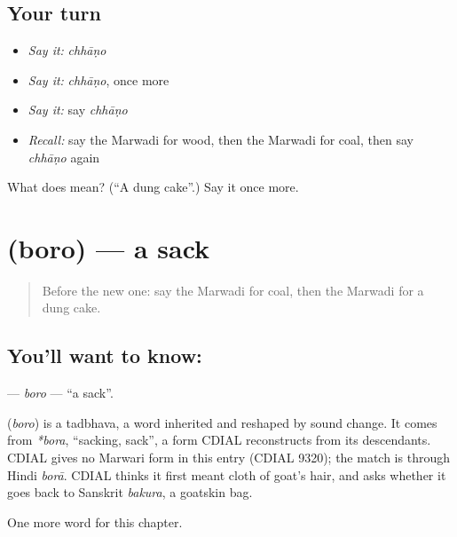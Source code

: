 \subsection*{Your turn}
\begin{itemize}
\raggedright
  \item \emph{Say it:} \emph{chhāṇo}
  \item \emph{Say it:} \emph{chhāṇo}, once more
  \item \emph{Say it:} say \emph{chhāṇo}
  \item \emph{Recall:} say the Marwadi for wood, then the Marwadi for coal, then say \emph{chhāṇo} again
\end{itemize}

\begin{tcolorbox}[breakable,colback=teal!4,colframe=teal!35!black,title={Before you move on}]
What does  mean? (\textquotedblleft{}A dung cake\textquotedblright{}.) Say it once more.
\end{tcolorbox}
\section[\texorpdfstring{\mw{बोरो} (boro)}{बोरो (boro)}]{ (boro) — a sack}

\label{lesson:MW-C126-boro}



\begin{quote}
Before the new one: say the Marwadi for coal, then the Marwadi for a dung cake.
\end{quote}

\subsection*{You'll want to know: }
\textbf{} — \emph{boro} — \textquotedblleft{}a sack\textquotedblright{}.

\begin{cousinweb}
\textbf{} (\emph{boro}) is a tadbhava, a word inherited and reshaped by sound change. It comes from \emph{*bora}, \textquotedblleft{}sacking, sack\textquotedblright{}, a form CDIAL reconstructs from its descendants. CDIAL gives no Marwari form in this entry (CDIAL 9320); the match is through Hindi \emph{borā}. CDIAL thinks it first meant cloth of goat's hair, and asks whether it goes back to Sanskrit \emph{bakura}, a goatskin bag.
\end{cousinweb}

\begin{grammarlens}[title={What you've built}]
One more word for this chapter.
\end{grammarlens}

